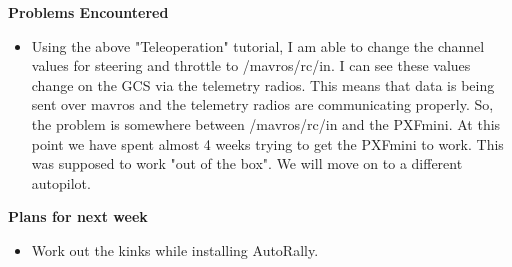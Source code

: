 \documentclass[compsoc,draftclsnofoot,onecolumn,10pt]{IEEEtran}
\begin{document}
\textbf{Problems Encountered}
\begin{itemize}
    \item Using the above "Teleoperation" tutorial, I am able to change the channel values for steering and throttle to /mavros/rc/in. I can see these values change on the GCS via the telemetry radios. This means that data is being sent over mavros and the telemetry radios are communicating properly. So, the problem is somewhere between /mavros/rc/in and the PXFmini. At this point we have spent almost 4 weeks trying to get the PXFmini to work. This was supposed to work "out of the box". We will move on to a different autopilot.
\end{itemize}

\textbf{Plans for next week}
\begin{itemize}
    \item Work out the kinks while installing AutoRally.
\end{itemize}
\end{document}
